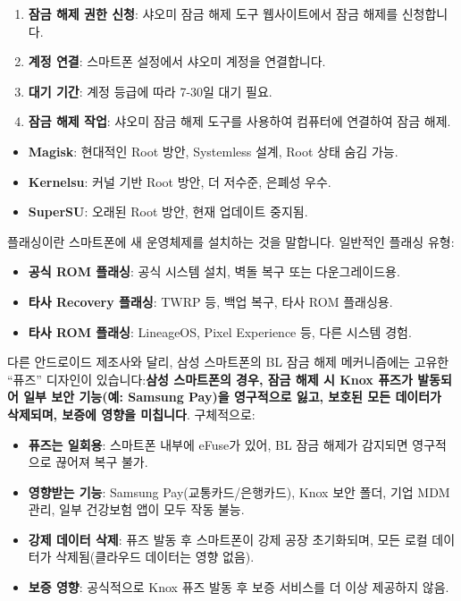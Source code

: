 \begin{enumerate}
  \item \textbf{잠금 해제 권한 신청}: 샤오미 잠금 해제 도구 웹사이트에서 잠금 해제를 신청합니다.
  \item \textbf{계정 연결}: 스마트폰 설정에서 샤오미 계정을 연결합니다.
  \item \textbf{대기 기간}: 계정 등급에 따라 7-30일 대기 필요.
  \item \textbf{잠금 해제 작업}: 샤오미 잠금 해제 도구를 사용하여 컴퓨터에 연결하여 잠금 해제.
\end{enumerate}


\begin{itemize}
  \item \textbf{Magisk}: 현대적인 Root 방안, Systemless 설계, Root 상태 숨김 가능.
  \item \textbf{Kernelsu}: 커널 기반 Root 방안, 더 저수준, 은폐성 우수.
  \item \textbf{SuperSU}: 오래된 Root 방안, 현재 업데이트 중지됨.
\end{itemize}


플래싱이란 스마트폰에 새 운영체제를 설치하는 것을 말합니다. 일반적인 플래싱 유형:

\begin{itemize}
  \item \textbf{공식 ROM 플래싱}: 공식 시스템 설치, 벽돌 복구 또는 다운그레이드용.
  \item \textbf{타사 Recovery 플래싱}: TWRP 등, 백업 복구, 타사 ROM 플래싱용.
  \item \textbf{타사 ROM 플래싱}: LineageOS, Pixel Experience 등, 다른 시스템 경험.
\end{itemize}


다른 안드로이드 제조사와 달리, 삼성 스마트폰의 BL 잠금 해제 메커니즘에는 고유한 “퓨즈” 디자인이 있습니다:\textbf{삼성 스마트폰의 경우, 잠금 해제 시 Knox 퓨즈가 발동되어 일부 보안 기능(예: Samsung Pay)을 영구적으로 잃고, 보호된 모든 데이터가 삭제되며, 보증에 영향을 미칩니다}. 구체적으로:

\begin{itemize}
  \item \textbf{퓨즈는 일회용}: 스마트폰 내부에 eFuse가 있어, BL 잠금 해제가 감지되면 영구적으로 끊어져 복구 불가.
  \item \textbf{영향받는 기능}: Samsung Pay(교통카드/은행카드), Knox 보안 폴더, 기업 MDM 관리, 일부 건강보험 앱이 모두 작동 불능.
  \item \textbf{강제 데이터 삭제}: 퓨즈 발동 후 스마트폰이 강제 공장 초기화되며, 모든 로컬 데이터가 삭제됨(클라우드 데이터는 영향 없음).
  \item \textbf{보증 영향}: 공식적으로 Knox 퓨즈 발동 후 보증 서비스를 더 이상 제공하지 않음.
\end{itemize}

